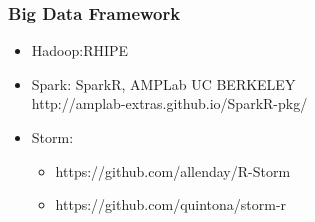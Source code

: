 \documentclass[UTF8]{beamer}\usepackage[]{graphicx}\usepackage[]{color}
\begin{document}
\begin{frame}
  \frametitle{Big Data Framework}
  \begin{itemize}
    \item Hadoop:RHIPE
    \item Spark: SparkR, AMPLab UC BERKELEY\\
    http://amplab-extras.github.io/SparkR-pkg/
    \item Storm:
    \begin{itemize}
      \item https://github.com/allenday/R-Storm
      \item https://github.com/quintona/storm-r
    \end{itemize}
  \end{itemize}
\end{frame}
\end{document}
